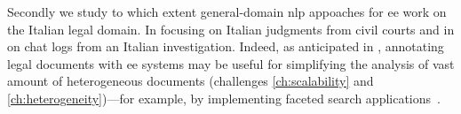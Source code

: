 Secondly we study to which extent general-domain \ac{nlp} appoaches for \acl{ee} work on the Italian legal domain.
In  focusing on Italian judgments from civil courts and in  on chat logs from an Italian investigation. Indeed, as anticipated in , annotating legal documents with \ac{ee} systems may be useful for simplifying the analysis of vast amount of heterogeneous documents (challenges \ref{ch:scalability} and \ref{ch:heterogeneity})---for example, by implementing faceted search applications~\cite{ARMENTANO2014_nlp_faceted,hearst_2006_faceted}.











